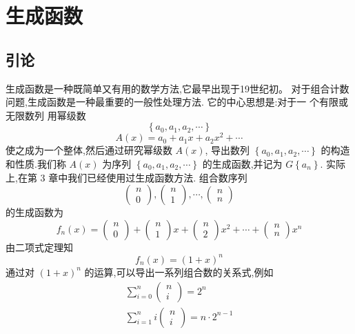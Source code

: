 \documentclass{report}
\begin{document}
\chapter{生成函数}

\section{引论}
生成函数是一种既简单又有用的数学方法,它最早出现于19世纪初。 对于组合计数问题,生成函数是一种最重要的一般性处理方法. 它的中心思想是:对于一 个有限或无限数列
用幂级数
$$
\left\{a_{0}, a_{1}, a_{2}, \cdots\right\}
$$
$$
A(x)=a_{0}+a_{1} x+a_{2} x^{2}+\cdots
$$
使之成为一个整体,然后通过研究幂级数 $A(x)$, 导出数列 $\left\{a_{0}, a_{1}, a_{2}, \cdots\right\}$ 的构造 和性质.我们称 $A(x)$ 为序列 $\left\{a_{0}, a_{1}, a_{2}, \cdots\right\}$ 的生成函数,并记为 $G\left\{a_{n}\right\}$.
实际上,在第 3 章中我们已经使用过生成函数方法. 组合数序列
$$
\left(\begin{array}{l}
n \\ 0
\end{array}\right),\left(\begin{array}{l}
n \\ 1
\end{array}\right), \cdots,\left(\begin{array}{l}
n \\ n
\end{array}\right)
$$
的生成函数为
$$
f_{n}(x)=\left(\begin{array}{l}
n \\ 0
\end{array}\right)+\left(\begin{array}{l}
n \\ 1
\end{array}\right) x+\left(\begin{array}{l}
n \\ 2
\end{array}\right) x^{2}+\cdots+\left(\begin{array}{l}
n \\ n
\end{array}\right) x^{n}
$$
由二项式定理知
$$
f_{n}(x)=(1+x)^{n}
$$
通过对 $(1+x)^{n}$ 的运算,可以导出一系列组合数的关系式,例如
$$
\begin{array}{l}
\sum_{i=0}^{n}\left(\begin{array}{l}
n \\ i
\end{array}\right)=2^{n} \\
\sum_{i=1}^{n} i\left(\begin{array}{l}
n \\ i
\end{array}\right)=n \cdot 2^{n-1}
\end{array}
$$
\end{document}

